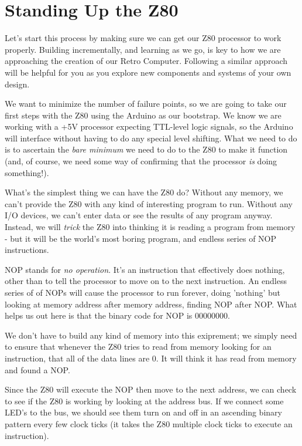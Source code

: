 \section{Standing Up the Z80}

Let's start this process by making sure we can get our Z80 processor to work properly. Building incrementally, and learning as we go,
is key to how we are approaching the creation of our Retro Computer. Following a similar approach will be helpful for you as you explore new components and systems of your own design.

We want to minimize the number of failure points, so we are going to take our first steps with the Z80 using the Arduino as our bootstrap. We know we are working with a +5V processor expecting TTL-level logic signals, so the Arduino will interface without having to do any special level shifting. What we need to do is to ascertain the \textit{bare minimum} we need to do to the Z80 to make it function (and, of course, we need some way of confirming that the processor \textit{is} doing something!).

What's the simplest thing we can have the Z80 do? Without any memory, we can't provide the Z80 with any kind of interesting program to run. Without any I/O devices, we can't enter data or see the results of any program anyway. Instead, we will \textit{trick} the Z80 into thinking it is reading a program from memory - but it will be the world's most boring program, and endless series of NOP instructions.

NOP stands for \textit{no operation}. It's an instruction that effectively does nothing, other than to tell the processor to move on to the next instruction. An endless series of of NOPs will cause the processor to run forever, doing 'nothing' but looking at memory address after memory address, finding NOP after NOP. What helps us out here is that the binary code for NOP is 00000000.

We don't have to build any kind of memory into this exiprement; we simply need to ensure that whenever the Z80 tries to read from memory looking for an instruction, that all of the data lines are 0. It will think it has read from memory and found a NOP.

Since the Z80 will execute the NOP then move to the next address, we can check to see if the Z80 is working by looking at the address bus. If we connect some LED's to the bus, we should see them turn on and off in an ascending binary pattern every few clock ticks (it takes the Z80 multiple clock ticks to execute an instruction).

